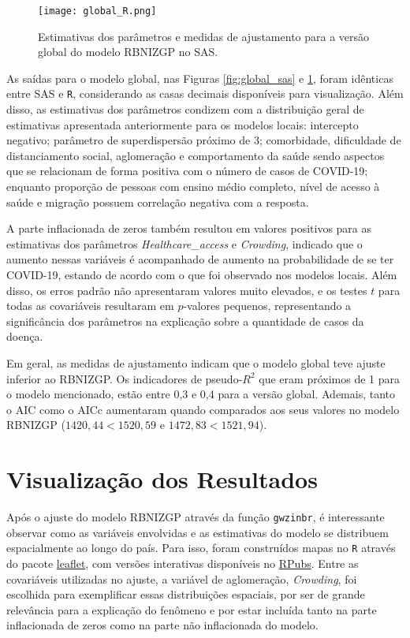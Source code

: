 \documentclass[12pt, a4paper, twoside]{report}
\numberwithin{equation}{section} %
\begin{document}
\begin{figure}[!htb]
    \centering
    \texttt{[image: global\_R.png]}
    \caption{Estimativas dos parâmetros e medidas de ajustamento para a versão global do modelo RBNIZGP no SAS.}
\label{fig:global_R}
\end{figure}

As saídas para o modelo global, nas Figuras \ref{fig:global_sas} e \ref{fig:global_R}, foram idênticas entre SAS e \texttt{R}, considerando as casas decimais disponíveis para visualização. Além disso, as estimativas dos parâmetros condizem com a distribuição geral de estimativas apresentada anteriormente para os modelos locais: intercepto negativo; parâmetro de superdispersão próximo de 3; comorbidade, dificuldade de distanciamento social, aglomeração e comportamento da saúde sendo aspectos que se relacionam de forma positiva com o número de casos de COVID-19; enquanto proporção de pessoas com ensino médio completo, nível de acesso à saúde e migração possuem correlação negativa com a resposta.

A parte inflacionada de zeros também resultou em valores positivos para as estimativas dos parâmetros \textit{Healthcare\_access} e \textit{Crowding}, indicado que o aumento nessas variáveis é acompanhado de aumento na probabilidade de se ter COVID-19, estando de acordo com o que foi observado nos modelos locais. Além disso, os erros padrão não apresentaram valores muito elevados, e os testes $t$ para todas as covariáveis resultaram em $p$-valores pequenos, representando a significância dos parâmetros na explicação sobre a quantidade de casos da doença.

Em geral, as medidas de ajustamento indicam que o modelo global teve ajuste inferior ao RBNIZGP. Os indicadores de pseudo-$R^2$ que eram próximos de 1 para o modelo mencionado, estão entre 0,3 e 0,4 para a versão global. Ademais, tanto o AIC como o AICc aumentaram quando comparados aos seus valores no modelo RBNIZGP ($1420,44<1520,59$ e $1472,83<1521,94$).


\section{Visualização dos Resultados}

Após o ajuste do modelo RBNIZGP através da função \texttt{gwzinbr}, é interessante observar como as variáveis envolvidas e as estimativas do modelo se distribuem espacialmente ao longo do país. Para isso, foram construídos mapas no \texttt{R} através do pacote \href{https://cran.r-project.org/web/packages/leaflet/index.html}{leaflet}, com versões interativas disponíveis no \href{https://rpubs.com/julianamrosa/1198864}{RPubs}. Entre as covariáveis utilizadas no ajuste, a variável de aglomeração, \textit{Crowding}, foi escolhida para exemplificar essas distribuições espaciais, por ser de grande relevância para a explicação do fenômeno e por estar incluída tanto na parte inflacionada de zeros como na parte não inflacionada do modelo.
\end{document}
